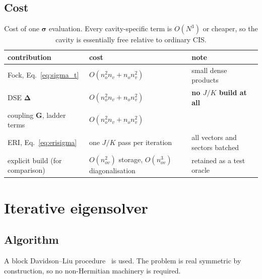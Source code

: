 \documentclass[11pt]{article}
\newcommand{\nov}{n_{ov}}
\newcommand{\nocc}{n_{o}}
\newcommand{\nvir}{n_{v}}
\begin{document}
\subsection{Cost}

\begin{table}[h]
\centering
\small
\begin{tabular}{@{}lll@{}}
\toprule
contribution & cost & note \\
\midrule
Fock, Eq.~\eqref{eq:sigma_t} & $O(\nocc^2\nvir + \nocc\nvir^2)$ & small dense products \\
DSE $\bm{\Delta}$ & $O(\nocc^2\nvir + \nocc\nvir^2)$ & \textbf{no $J/K$ build at all} \\
coupling $\bm{G}$, ladder terms & $O(\nocc^2\nvir + \nocc\nvir^2)$ & \\
ERI, Eq.~\eqref{eq:erisigma} & one $J/K$ pass per iteration & all vectors and sectors batched \\
\midrule
explicit build (for comparison) & $O(\nov^2)$ storage, $O(\nov^3)$ diagonalisation & retained as a test oracle \\
\bottomrule
\end{tabular}
\caption{Cost of one $\bm{\sigma}$ evaluation. Every cavity-specific term is
$O(N^3)$ or cheaper, so the cavity is essentially free relative to ordinary CIS.}
\end{table}

\section{Iterative eigensolver}

\subsection{Algorithm}

A block Davidson--Liu procedure~\cite{Davidson1975, Liu1978} is used. The
problem is real symmetric by construction, so no non-Hermitian machinery is
required.
\end{document}
